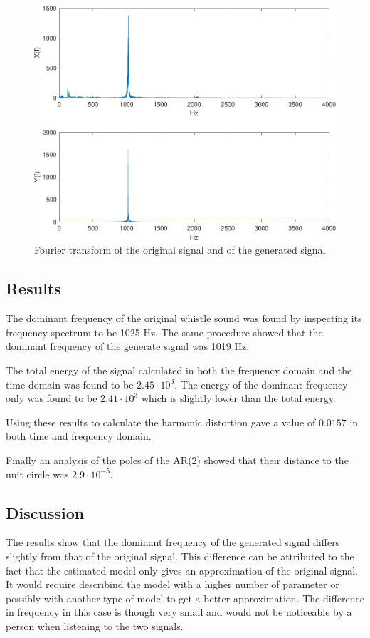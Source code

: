 \documentclass{IEEEtran}
\begin{document}
\begin{figure}[h]
  \centering
  \captionsetup{justification=centering}

  \includegraphics[width=0.8\columnwidth]{pictures/whistle_gen_freq.pdf}
  \caption{Fourier transform of the original signal and of the generated signal}
  \label{1:whistle_gen_freq}

\end{figure}

\subsection{Results}
The dominant frequency of the original whistle sound was found by inspecting
its frequency spectrum to be 1025 Hz. The same procedure showed that the
dominant frequency of the generate signal was 1019 Hz.

The total energy of the signal calculated in both the frequency domain and
the time domain was found to be $2.45\cdot10^3$. The energy of the dominant
frequency only was found to be $2.41\cdot10^3$ which is slightly lower
than the total energy.

Using these results to calculate the harmonic distortion gave a value
of $0.0157$ in both time and frequency domain.

Finally an analysis of the poles of the AR(2) showed that their distance
to the unit circle was $2.9\cdot10^{-5}$.

\subsection{Discussion}
The results show that the dominant frequency of the generated signal
differs slightly from that of the original signal. This difference can
be attributed to the fact that the estimated model only gives an
approximation of the original signal. It would require describind the
model with a higher number of parameter or possibly with another type
of model to get a better approximation. The difference in frequency
in this case is though very small and would not be noticeable
by a person when listening to the two signals.
\end{document}
